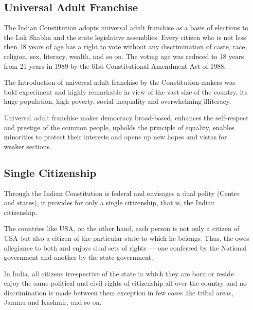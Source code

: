 \subsection{Universal Adult Franchise}

The Indian Constitution adopts universal adult franchise as a basis of elections to the Lok Shabha and the state legislative assemblies. Every citizen who is not less then 18 years of age has a right to vote without any discrimination of caste, race, religion, sex, literacy, wealth, and so on. The voting age was reduced to 18 years from 21 years in 1989 by the 61st Constitutional Amendment Act of 1988.

The Introduction of universal adult franchise by the Constitution-makers was bold experiment and highly remarkable in view of the vast size of the country, its huge population, high poverty, social inequality and overwhelming illiteracy.

Universal adult franchise makes democracy broad-based, enhances the self-respect and prestige of the common people, upholds the principle of equality, enables minorities to protect their interests and opens up new hopes and vistas for weaker sections.

\subsection{Single Citizenship}

Through the Indian Constitution is federal and envisages a dual polity (Centre and states), it provides for only a single citizenship, that is, the Indian citizenship.

The countries like USA, on the other hand, each person is not only a citizen of USA but also a citizen of the particular state to which he belongs. Thus, the owes allegiance to both and enjoys dual sets of rights — one conferred by the National government and another by the state government.

In India, all citizens irrespective of the state in which they are born or reside enjoy the same political and civil rights of citizenship all over the country and no discrimination is made between them exception in few cases like tribal areas, Jammu and Kashmir, and so on.

